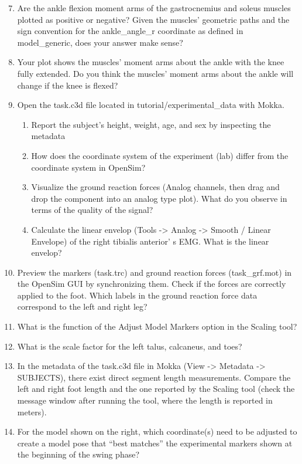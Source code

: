 \documentclass[11pt]{article}
\begin{document}
\begin{enumerate}
    \setcounter{enumi}{6}
    \item Are the ankle flexion moment arms of the gastrocnemius and soleus muscles plotted as positive or negative? Given the muscles’ geometric paths and the sign convention for the ankle\_angle\_r coordinate as defined in model\_generic, does your answer make sense?
    \item Your plot shows the muscles’ moment arms about the ankle with the knee fully extended. Do you think the muscles’ moment arms about the ankle will change if the knee is flexed?
    \item Open the task.c3d file located in tutorial/experimental\_data with Mokka.
    \begin{enumerate}
        \item Report the subject's height, weight, age, and sex by inspecting the metadata
        \item How does the coordinate system of the experiment (lab) differ from the coordinate
        system in OpenSim?
        \item Visualize the ground reaction forces (Analog channels, then drag and drop the
        component into an analog type plot). What do you observe in terms of the quality of
        the signal?
        \item Calculate the linear envelop (Tools -> Analog -> Smooth / Linear Envelope) of the right
        tibialis anterior’ s EMG. What is the linear envelop?
    \end{enumerate}
    \item Preview the markers (task.trc) and ground reaction forces (task\_grf.mot) in the OpenSim GUI
    by synchronizing them. Check if the forces are correctly applied to the foot. Which labels in the ground reaction force data correspond to the left and right leg?
    \item What is the function of the Adjust Model Markers option in the Scaling tool?
    \item What is the scale factor for the left talus, calcaneus, and toes?
    \item In the metadata of the task.c3d file in Mokka (View -> Metadata -> SUBJECTS), there exist direct segment length measurements. Compare the left and right foot length and the one reported by the Scaling tool (check the message window after running the tool, where the length is reported in meters).
    \item For the model shown on the right, which coordinate(s) need to be adjusted to create a model pose that “best matches” the experimental markers shown at the beginning of the swing phase?

\end{enumerate}
\end{document}

